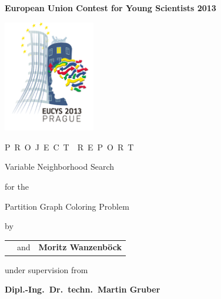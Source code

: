 \documentclass[paper = a4, fontsize = 10pt]{scrartcl}
\begin{document}
\begin{titlepage}
\begin{center}
\vspace*{\fill}
{\Large\bfseries European Union Contest for Young Scientists 2013}

\vspace{2mm}

\includegraphics[width=4cm]{eucys.png}

\vspace{10mm}

{\Large P}\ {\large R\ O\ J\ E\ C\ T}\ \ {\Large R}\ {\large E\ P\ O\ R\ T}

\vspace{10mm}

{\bfseries

{\Huge Variable Neighborhood Search}

{\huge for the}

{\Huge Partition Graph Coloring Problem}

}

by

\begin{tabular}{>{\raggedright\arraybackslash}p{}c>{\raggedleft\arraybackslash}p{}}
{\large\bfseries Lorenz Leutgeb} & and & {\large\bfseries Moritz Wanzenböck} \\
\end{tabular}

under supervision from

{\large\bfseries Dipl.-Ing.\ Dr.\ techn.\ Martin Gruber}
\vspace*{\fill}
\end{center}
\end{titlepage}
\tableofcontents
\newpage

\end{document}
